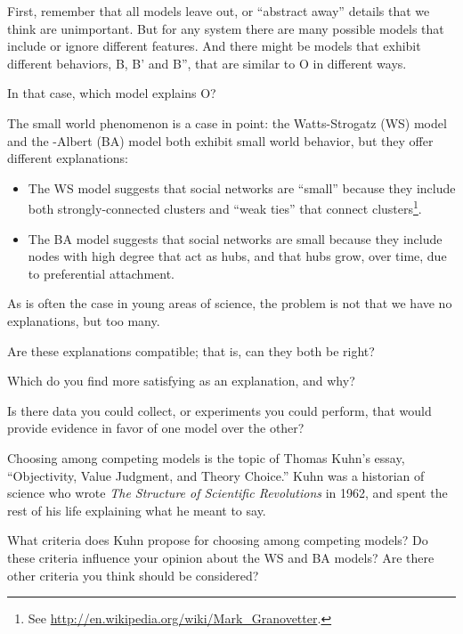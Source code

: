 \documentclass[10pt]{book}
\begin{document}
First, remember that all models leave out, or ``abstract away''
details that we think are unimportant.  But for any system there
are many possible models that include or ignore different features.
And there might be models that exhibit different behaviors,
B, B' and B'', that are similar to O in different ways.

In that case, which model explains O?

The small world phenomenon is a case in point: the
Watts-Strogatz (WS) model and the \Barabasi-Albert (BA) model
both exhibit small world behavior, but they offer different
explanations:

\begin{itemize}

\item The WS model suggests that social networks are ``small'' because
  they include both strongly-connected clusters and ``weak ties'' that
  connect clusters\footnote{See
    \url{http://en.wikipedia.org/wiki/Mark_Granovetter}.}.

\item The BA model suggests that social networks are small because
  they include nodes with high degree that act as hubs, and that
  hubs grow, over time, due to preferential attachment.

\end{itemize}

As is often the case in young areas of science, the problem is
not that we have no explanations, but too many.


\begin{ex}

Are these explanations compatible; that is, can they both be right?

Which do you find more satisfying as an explanation, and why?

Is there data you could collect, or experiments you could perform,
that would provide evidence in favor of one model over the other?

Choosing among competing models is the topic of Thomas Kuhn's
essay, ``Objectivity, Value Judgment, and Theory Choice.''
Kuhn was a historian of science who wrote {\em The
Structure of Scientific Revolutions} in 1962, and spent the rest of
his life explaining what he meant to say.

What criteria does Kuhn propose for choosing among competing models?
Do these criteria influence your opinion about the WS and BA models?
Are there other criteria you think should be considered?

\end{ex}
\end{document}
